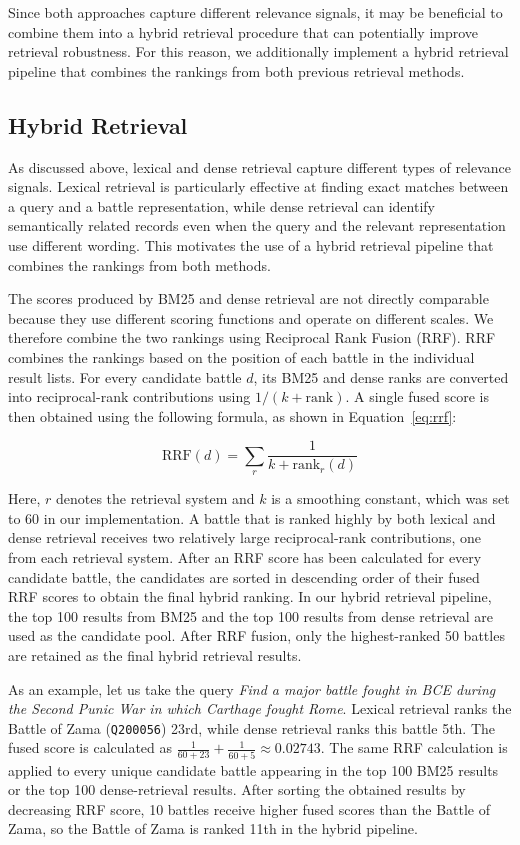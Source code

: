 Since both approaches capture different relevance signals, it may be beneficial to combine them into a hybrid retrieval procedure that can potentially improve retrieval robustness. For this reason, we additionally implement a hybrid retrieval pipeline that combines the rankings from both previous retrieval methods.
\subsection{Hybrid Retrieval}
As discussed above, lexical and dense retrieval capture different types of relevance signals. Lexical retrieval is particularly effective at finding exact matches between a query and a battle representation, while dense retrieval can identify semantically related records even when the query and the relevant representation use different wording. This motivates the use of a hybrid retrieval pipeline that combines the rankings from both methods.

The scores produced by BM25 and dense retrieval are not directly comparable because they use different scoring functions and operate on different scales. We therefore combine the two rankings using Reciprocal Rank Fusion (RRF). RRF combines the rankings based on the position of each battle in the individual result lists. 
For every candidate battle $d$, its BM25 and dense ranks are converted into reciprocal-rank contributions using $1/(k + \mathrm{rank})$.
A single fused score is then obtained using the following formula, as shown in Equation~\eqref{eq:rrf}:

\begin{equation}
    \mathrm{RRF}(d) =
    \sum_{r} \frac{1}{k + \mathrm{rank}_r(d)}
    \label{eq:rrf}
\end{equation}

Here, $r$ denotes the retrieval system and $k$ is a smoothing constant, which was set to 60 in our implementation. A battle that is ranked highly by both lexical and dense retrieval receives two relatively large reciprocal-rank contributions, one from each retrieval system. After an RRF score has been calculated for every candidate battle, the candidates are sorted in descending order of their fused RRF scores to obtain the final hybrid ranking. In our hybrid retrieval pipeline, the top 100 results from BM25 and the top 100 results from dense retrieval are used as the candidate pool. After RRF fusion, only the highest-ranked 50 battles are retained as the final hybrid retrieval results. 

As an example, let us take the query \textit{Find a major battle fought in BCE during the Second Punic War in which Carthage fought Rome}. Lexical retrieval ranks the Battle of Zama (\texttt{Q200056}) 23rd, while dense retrieval ranks this battle 5th. The fused score is calculated as
$\frac{1}{60+23} + \frac{1}{60+5} \approx 0.02743$. The same RRF calculation is applied to every unique candidate battle appearing in the top 100 BM25 results or the top 100 dense-retrieval results. After sorting the obtained results by decreasing RRF score, 10 battles receive higher fused scores than the Battle of Zama, so the Battle of Zama is ranked 11th in the hybrid pipeline. 
